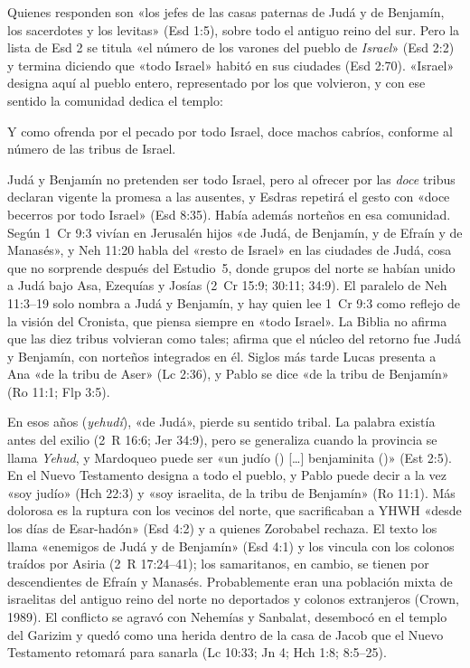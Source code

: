 Quienes responden son «los jefes de las casas paternas de Judá y de Benjamín, los sacerdotes y los levitas» (Esd 1:5), sobre todo el antiguo reino del sur. Pero la lista de Esd 2 se titula «el número de los varones del pueblo de \emph{Israel}» (Esd 2:2) y termina diciendo que «todo Israel» habitó en sus ciudades (Esd 2:70). «Israel» designa aquí al pueblo entero, representado por los que volvieron, y con ese sentido la comunidad dedica el templo:
\begin{cita}Y como ofrenda por el pecado por todo Israel, doce machos cabríos, conforme al número de las tribus de Israel.\end{cita}
Judá y Benjamín no pretenden ser todo Israel, pero al ofrecer por las \emph{doce} tribus declaran vigente la promesa a las ausentes, y Esdras repetirá el gesto con «doce becerros por todo Israel» (Esd 8:35). Había además norteños en esa comunidad. Según 1~Cr 9:3 vivían en Jerusalén hijos «de Judá, de Benjamín, y de Efraín y de Manasés», y Neh 11:20 habla del «resto de Israel» en las ciudades de Judá, cosa que no sorprende después del Estudio~5, donde grupos del norte se habían unido a Judá bajo Asa, Ezequías y Josías (2~Cr 15:9; 30:11; 34:9). El paralelo de Neh 11:3--19 solo nombra a Judá y Benjamín, y hay quien lee 1~Cr 9:3 como reflejo de la visión del Cronista, que piensa siempre en «todo Israel». La Biblia no afirma que las diez tribus volvieran como tales; afirma que el núcleo del retorno fue Judá y Benjamín, con norteños integrados en él. Siglos más tarde Lucas presenta a Ana «de la tribu de Aser» (Lc 2:36), y Pablo se dice «de la tribu de Benjamín» (Ro 11:1; Flp 3:5).

En esos años  (\emph{yehudí}), «de Judá», pierde su sentido tribal. La palabra existía antes del exilio (2~R 16:6; Jer 34:9), pero se generaliza cuando la provincia se llama \emph{Yehud}, y Mardoqueo puede ser «un judío () [\ldots] benjaminita ()» (Est 2:5). En el Nuevo Testamento  designa a todo el pueblo, y Pablo puede decir a la vez «soy judío» (Hch 22:3) y «soy israelita, de la tribu de Benjamín» (Ro 11:1). Más dolorosa es la ruptura con los vecinos del norte, que sacrificaban a YHWH «desde los días de Esar-hadón» (Esd 4:2) y a quienes Zorobabel rechaza. El texto los llama «enemigos de Judá y de Benjamín» (Esd 4:1) y los vincula con los colonos traídos por Asiria (2~R 17:24--41); los samaritanos, en cambio, se tienen por descendientes de Efraín y Manasés. Probablemente eran una población mixta de israelitas del antiguo reino del norte no deportados y colonos extranjeros (Crown, 1989). El conflicto se agravó con Nehemías y Sanbalat, desembocó en el templo del Garizim y quedó como una herida dentro de la casa de Jacob que el Nuevo Testamento retomará para sanarla (Lc 10:33; Jn 4; Hch 1:8; 8:5--25).

